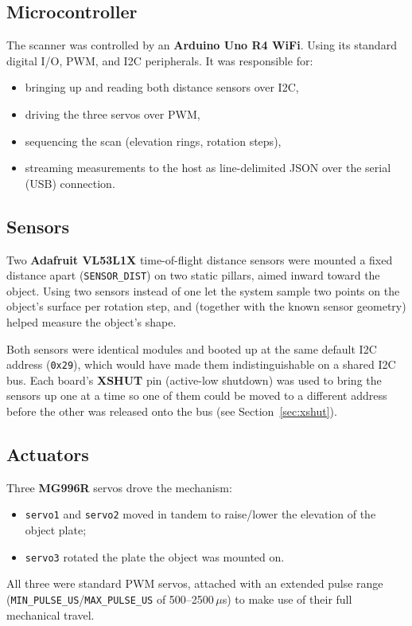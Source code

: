 \documentclass[11pt]{article}
\begin{document}
\subsection{Microcontroller}

The scanner was controlled by an \textbf{Arduino Uno R4 WiFi}. Using its
standard digital I/O, PWM, and I2C peripherals. It was responsible for:
\begin{itemize}
  \item bringing up and reading both distance sensors over I2C,
  \item driving the three servos over PWM,
  \item sequencing the scan (elevation rings, rotation steps),
  \item streaming measurements to the host as line-delimited JSON over the
    serial (USB) connection.
\end{itemize}

\subsection{Sensors}

Two \textbf{Adafruit VL53L1X} time-of-flight distance sensors were mounted a
fixed distance apart (\texttt{SENSOR\_DIST}) on two static pillars, aimed
inward toward the object. Using two sensors instead of one let the system
sample two points on the object's surface per rotation step, and (together
with the known sensor geometry) helped measure the object's shape.

Both sensors were identical modules and booted up at the same default I2C
address (\texttt{0x29}), which would have made them indistinguishable on a
shared I2C bus. Each board's \textbf{XSHUT} pin (active-low shutdown) was
used to bring the sensors up one at a time so one of them could be moved to a
different address before the other was released onto the bus (see
Section~\ref{sec:xshut}).

\subsection{Actuators}

Three \textbf{MG996R} servos drove the mechanism:
\begin{itemize}
  \item \texttt{servo1} and \texttt{servo2} moved in tandem to raise/lower
    the elevation of the object plate;
  \item \texttt{servo3} rotated the plate the object was mounted on.
\end{itemize}
All three were standard PWM servos, attached with an extended pulse
range (\texttt{MIN\_PULSE\_US}/\texttt{MAX\_PULSE\_US} of 500--2500\,$\mu$s)
to make use of their full mechanical travel.
\end{document}
